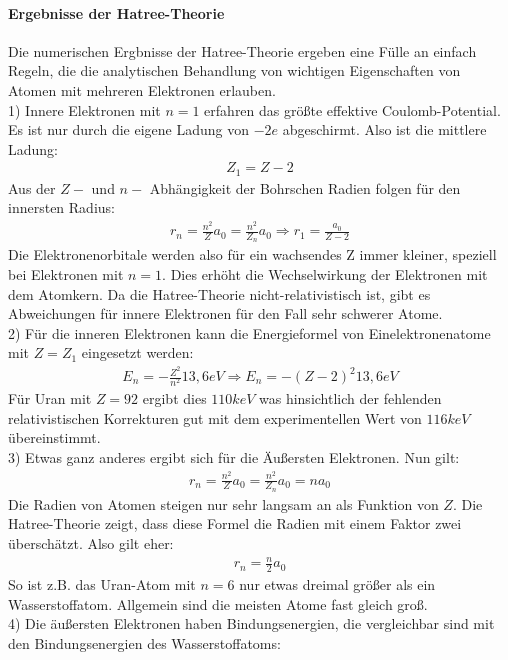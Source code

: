\documentclass[10pt,a4paper]{article}
\begin{document}
\paragraph{Ergebnisse der Hatree-Theorie}
Die numerischen Ergbnisse der Hatree-Theorie ergeben eine Fülle an einfach Regeln, die die analytischen Behandlung von wichtigen Eigenschaften von Atomen mit mehreren Elektronen erlauben.\\
1) Innere Elektronen mit $n=1$ erfahren das größte effektive Coulomb-Potential. Es ist nur durch die eigene Ladung von $-2e$ abgeschirmt. Also ist die mittlere Ladung:
\begin{align}
Z_1=Z-2
\end{align}
Aus der $Z-$ und $n-$ Abhängigkeit der Bohrschen Radien folgen für den innersten Radius:
\begin{align}
r_n=\frac{n^2}{Z}a_0 = \frac{n^2}{Z_n} a_0 \Rightarrow r_1 = \frac{a_0}{Z-2}
\end{align}
Die Elektronenorbitale werden also für ein wachsendes Z immer kleiner, speziell bei Elektronen mit $n=1$. Dies erhöht die Wechselwirkung der Elektronen mit dem Atomkern. Da die Hatree-Theorie nicht-relativistisch ist, gibt es Abweichungen für innere Elektronen für den Fall sehr schwerer Atome.\\
2) Für die inneren Elektronen kann die Energieformel von Einelektronenatome mit $Z=Z_1$ eingesetzt werden:
\begin{align}
E_n=-\frac{Z^2}{n^2} 13,6 eV \Rightarrow E_n=-(Z-2)^2 13,6 eV
\end{align}
Für Uran mit $Z=92$ ergibt dies $110 keV$ was hinsichtlich der fehlenden relativistischen Korrekturen gut mit dem experimentellen Wert von $ 116 keV$ übereinstimmt.\\
3) Etwas ganz anderes ergibt sich für die Äußersten Elektronen. Nun gilt:
\begin{align}
r_n=\frac{n^2}{Z} a_0 = \frac{n^2}{Z_n} a_0 =na_0
\end{align}
Die Radien von Atomen steigen nur sehr langsam an als Funktion von $Z$. Die Hatree-Theorie zeigt, dass diese Formel die Radien mit einem Faktor zwei überschätzt. Also gilt eher:
\begin{align}
r_n=\frac{n}{2} a_0
\end{align}
So ist z.B. das Uran-Atom mit $n=6$ nur etwas dreimal größer als ein Wasserstoffatom. Allgemein sind die meisten Atome fast gleich groß.\\
4) Die äußersten Elektronen haben Bindungsenergien, die vergleichbar sind mit den Bindungsenergien des Wasserstoffatoms:
\end{document}
